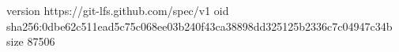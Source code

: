 version https://git-lfs.github.com/spec/v1
oid sha256:0dbe62c511ead5c75c068ee03b240f43ca38898dd325125b2336c7c04947c34b
size 87506
